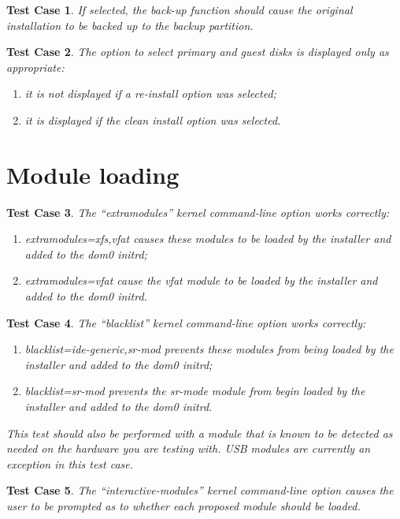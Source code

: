 \documentclass[a4paper]{article}
\newtheorem{testcase}{Test Case}
\begin{document}
\begin{testcase}
If selected, the back-up function should cause the original
installation to be backed up to the backup partition. 
\end{testcase}

\begin{testcase}
The option to select primary and guest disks is displayed only as
appropriate:
\begin{enumerate}
\item it is not displayed if a re-install option was selected;
\item it is displayed if the clean install option was selected.
\end{enumerate}
\end{testcase}


\section{Module loading}

\begin{testcase}
The ``extramodules'' kernel command-line option works correctly:
\begin{enumerate}
\item extramodules=xfs,vfat causes these modules to be loaded by the
  installer and added to the dom0 initrd;
\item extramodules=vfat cause the vfat module to be loaded by the
  installer and added to the dom0 initrd.
\end{enumerate}
\end{testcase}

\begin{testcase}
The ``blacklist'' kernel command-line option works correctly:
\begin{enumerate}
\item blacklist=ide-generic,sr-mod prevents these modules from being
  loaded by the installer and added to the dom0 initrd;
\item blacklist=sr-mod prevents the sr-mode module from begin loaded
  by the installer and added to the dom0 initrd.
\end{enumerate}
This test should also be performed with a module that is known to be
detected as needed on the hardware you are testing with.  USB modules
are currently an exception in this test case.
\end{testcase}

\begin{testcase} \label{tc:interactive-modules}
The ``interactive-modules'' kernel command-line option causes the user
to be prompted as to whether each proposed module should be loaded.
\end{testcase}
\end{document}
